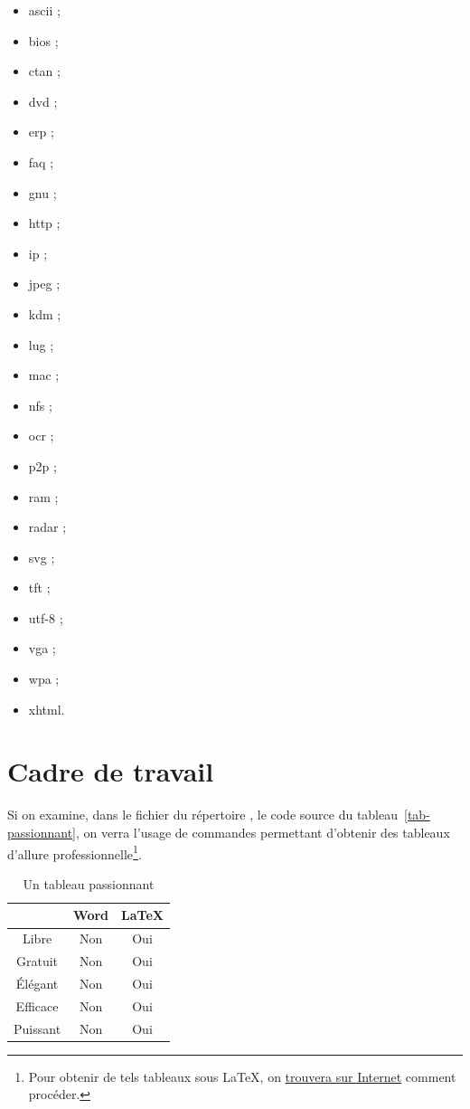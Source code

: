 \documentclass[12pt,version=final,space=onehalf,localtocs,localbibs]{yathesis}
\begin{document}
\begin{itemize}
\item \gls{ascii} ;
\item \gls{bios} ;
\item \gls{ctan} ;
\item \gls{dvd} ;
\item \gls{erp} ;
\item \gls{faq} ;
\item \gls{gnu} ;
\item \gls{http} ;
\item \gls{ip} ;
\item \gls{jpeg} ;
\item \gls{kdm} ;
\item \gls{lug} ;
\item \gls{mac} ;
\item \gls{nfs} ;
\item \gls{ocr} ;
\item \gls{p2p} ;
\item \gls{ram} ;
\item \gls{radar} ;
\item \gls{svg} ;
\item \gls{tft} ;
\item \gls{utf-8} ;
\item \gls{vga} ;
\item \gls{wpa} ;
\item \gls{xhtml}.
\end{itemize}
%
\section{Cadre de travail}\label{sec-cadre}
%
Si on examine, dans le fichier
 du répertoire , le code source
du tableau~\vref{tab-passionnant}, on verra l'usage
de commandes permettant d'obtenir des tableaux d'allure
professionnelle\footnote{Pour obtenir de tels tableaux sous \LaTeX{}, on
  \href{https://www.tug.org/pracjourn/2007-1/mori/mori.pdf}{trouvera sur
    Internet} comment procéder.}.
%
\begin{table}[ht]
  \centering
  \begin{tabular}{ccc}
    \toprule
    \multicolumn{1}{c}{} & Word & \LaTeX{} \\
    \midrule
    Libre                & Non  & Oui      \\
    Gratuit              & Non  & Oui      \\
    Élégant              & Non  & Oui      \\
    Efficace             & Non  & Oui      \\
    Puissant             & Non  & Oui      \\
    \bottomrule
  \end{tabular}
  \caption{Un tableau passionnant}
  \label{tab-passionnant}
\end{table}
\end{document}
